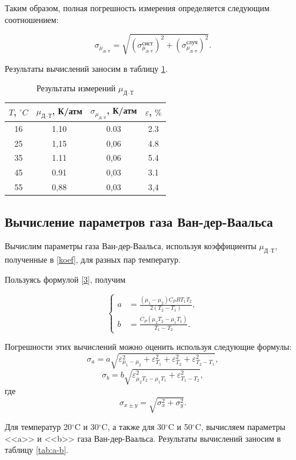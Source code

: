 \documentclass[12pt,a4paper]{article}
\begin{document}
Таким образом, полная погрешность измерения определяется следующим соотношением:

\[ \sigma_{\mu_\text{Д--Т}} = \sqrt{(\sigma_{\mu_\text{Д--Т}}^\text{сист})^2 + (\sigma_{\mu_\text{Д--Т}}^\text{случ})^2}.\]

Результаты вычислений заносим в таблицу \ref{tab:my-table}.
\label{koef}
\begin{table}[H]
	\centering
	\begin{tabular}{|c|c|c|c|}
		\hline
		$ T $, $ ^\circ C $ & $ \mu_\text{Д--Т} $, К/атм & $ \sigma_{\mu_\text{Д--Т}} $, К/атм & $ \varepsilon $, $ \% $ \\ \hline
		16 & 1.10 & 0.03 & 2.3 \\ \hline
		25 & 1,15 & 0,06 & 4.8 \\ \hline
		35 & 1.11 & 0,06 & 5.4 \\ \hline
		45 & 0.91 & 0,03 & 3.1 \\ \hline
		55 & 0,88 & 0,03 & 3,4 \\ \hline
	\end{tabular}
	\caption{Результаты измерений $ \mu_\text{Д--Т} $}
	\label{tab:my-table}
\end{table}

\subsection{Вычисление параметров газа Ван-дер-Ваальса}

Вычислим параметры газа Ван-дер-Ваальса, используя коэффициенты $ \mu_\text{Д--Т} $, полученные в \ref{koef}, для разных пар температур.

Пользуясь формулой \eqref{3}, получим 

\[ \left\{ \begin{aligned}
	 a &= \frac{\left(\mu_1 - \mu_2\right)C_PRT_1T_2}{2\left(T_2-T_1\right)}, \\
	b &= \frac{C_P(\mu_2T_2-\mu_1T_1)}{T_1-T_2}. \end{aligned} \right. \]

Погрешности этих вычислений можно оценить используя следующие формулы:~\[ \sigma_a = a\sqrt{\varepsilon^2_{\mu_1-\mu_2}+\varepsilon^2_{T_1}+\varepsilon^2_{T_2}+\varepsilon^2_{T_2-T_1}}, \] \[ \sigma_b=b\sqrt{\varepsilon^2_{\mu_2T_2-\mu_1T_1}+\varepsilon^2_{T_1-T_2}}, \] где \[ \sigma_{x\pm y} =\sqrt{\sigma^2_x+\sigma^2_y}. \]

Для температур 20$ ^\circ $C и 30$ ^\circ $C, а также для 30$ ^\circ $C и 50$ ^\circ $C, вычисляем параметры <<a>> и <<b>> газа Ван-дер-Ваальса. Результаты вычислений заносим в таблицу \ref{tab:a-b}.
\end{document}
